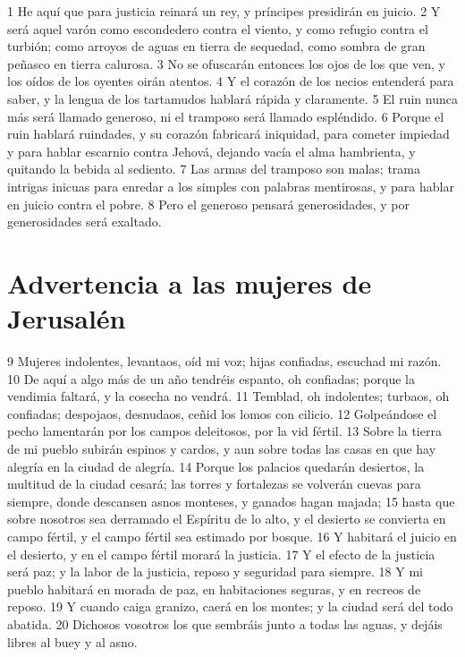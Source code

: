 1 He aquí que para justicia reinará un rey, y príncipes presidirán en juicio.
2 Y será aquel varón como escondedero contra el viento, y como refugio contra el turbión; como arroyos de aguas en tierra de sequedad, como sombra de gran peñasco en tierra calurosa.
3 No se ofuscarán entonces los ojos de los que ven, y los oídos de los oyentes oirán atentos.
4 Y el corazón de los necios entenderá para saber, y la lengua de los tartamudos hablará rápida y claramente.
5 El ruin nunca más será llamado generoso, ni el tramposo será llamado espléndido.
6 Porque el ruin hablará ruindades, y su corazón fabricará iniquidad, para cometer impiedad y para hablar escarnio contra Jehová, dejando vacía el alma hambrienta, y quitando la bebida al sediento.
7 Las armas del tramposo son malas; trama intrigas inicuas para enredar a los simples con palabras mentirosas, y para hablar en juicio contra el pobre.
8 Pero el generoso pensará generosidades, y por generosidades será exaltado.

\section*{Advertencia a las mujeres de Jerusalén}

9 Mujeres indolentes, levantaos, oíd mi voz; hijas confiadas, escuchad mi razón.
10 De aquí a algo más de un año tendréis espanto, oh confiadas; porque la vendimia faltará, y la cosecha no vendrá.
11 Temblad, oh indolentes; turbaos, oh confiadas; despojaos, desnudaos, ceñid los lomos con cilicio.
12 Golpeándose el pecho lamentarán por los campos deleitosos, por la vid fértil.
13 Sobre la tierra de mi pueblo subirán espinos y cardos, y aun sobre todas las casas en que hay alegría en la ciudad de alegría.
14 Porque los palacios quedarán desiertos, la multitud de la ciudad cesará; las torres y fortalezas se volverán cuevas para siempre, donde descansen asnos monteses, y ganados hagan majada;
15 hasta que sobre nosotros sea derramado el Espíritu de lo alto, y el desierto se convierta en campo fértil, y el campo fértil sea estimado por bosque.
16 Y habitará el juicio en el desierto, y en el campo fértil morará la justicia.
17 Y el efecto de la justicia será paz; y la labor de la justicia, reposo y seguridad para siempre.
18 Y mi pueblo habitará en morada de paz, en habitaciones seguras, y en recreos de reposo.
19 Y cuando caiga granizo, caerá en los montes; y la ciudad será del todo abatida.
20 Dichosos vosotros los que sembráis junto a todas las aguas, y dejáis libres al buey y al asno.

